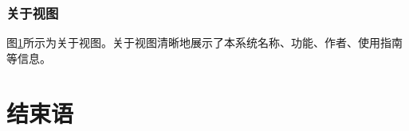 \documentclass[a4paper,AutoFakeBold,oneside,12pt]{book}
\begin{document}
\subsection{关于视图}

图\ref{}所示为关于视图。关于视图清晰地展示了本系统名称、功能、作者、使用指南等信息。


\chapter{结束语}

\end{document}
